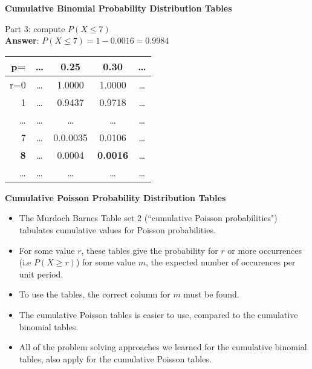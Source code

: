 \documentclass[a4]{beamer}
\begin{document}
{
\textbf{Cumulative Binomial Probability Distribution Tables}
\normalsize

Part 3:  compute $P(X \leq 7)$ \\ \textbf{Answer}: $P(X \leq 7)  = 1 - 0.0016 = 0.9984$

\begin{center}
\begin{tabular}{|r||c|c|c|c|}
  \hline
  p= & \ldots & 0.25 & \textbf{0.30} &  \ldots\\ \hline \hline
  r=0 & \ldots & 1.0000 & 1.0000 & \ldots\\
   1 & \ldots & 0.9437 & 0.9718 & \ldots \\

 \ldots & \ldots & \ldots & \ldots&\ldots \\
    7 & \ldots & 0.0.0035 & 0.0106 & \ldots \\
   \textbf{8} & \ldots & 0.0004 & \alert{\textbf{0.0016}} &\ldots \\
 \ldots & \ldots & \ldots & \ldots&\ldots \\
  \hline
\end{tabular}
\end{center}

}

{
\textbf{Cumulative Poisson Probability Distribution Tables}

\begin{itemize}
\item The Murdoch Barnes Table set 2 (``cumulative Poisson probabilities") tabulates cumulative values for Poisson probabilities.


\item For some value $r$, these tables give the probability for $r$ or more occurrences (i.e $P(X \geq r)$) for some value $m$, the expected number of occurences per unit period.

\item To use the tables, the correct column for $m$ must be found.
\item The cumulative Poisson tables is easier to use, compared to the cumulative binomial tables.
\item All of the problem solving approaches we learned for the cumulative binomial tables, also apply for the cumulative Poisson tables.
\end{itemize}
}
\end{document}
